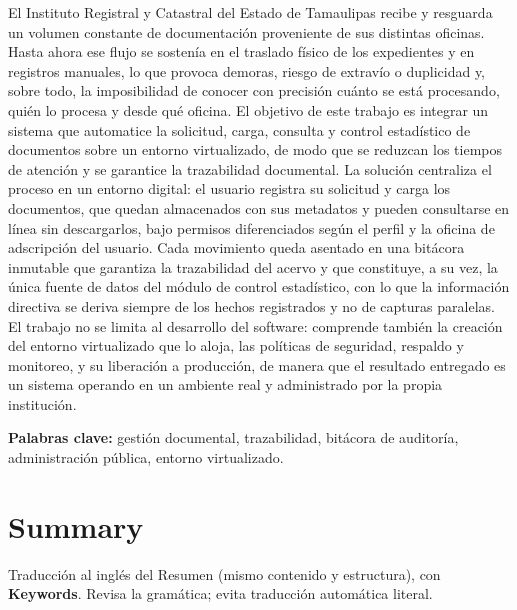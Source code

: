 El Instituto Registral y Catastral del Estado de Tamaulipas recibe y resguarda un volumen constante de documentación proveniente de sus distintas oficinas. Hasta ahora ese flujo se sostenía en el traslado físico de los expedientes y en registros manuales, lo que provoca demoras, riesgo de extravío o duplicidad y, sobre todo, la imposibilidad de conocer con precisión cuánto se está procesando, quién lo procesa y desde qué oficina. El objetivo de este trabajo es integrar un sistema que automatice la solicitud, carga, consulta y control estadístico de documentos sobre un entorno virtualizado, de modo que se reduzcan los tiempos de atención y se garantice la trazabilidad documental. La solución centraliza el proceso en un entorno digital: el usuario registra su solicitud y carga los documentos, que quedan almacenados con sus metadatos y pueden consultarse en línea sin descargarlos, bajo permisos diferenciados según el perfil y la oficina de adscripción del usuario. Cada movimiento queda asentado en una bitácora inmutable que garantiza la trazabilidad del acervo y que constituye, a su vez, la única fuente de datos del módulo de control estadístico, con lo que la información directiva se deriva siempre de los hechos registrados y no de capturas paralelas. El trabajo no se limita al desarrollo del software: comprende también la creación del entorno virtualizado que lo aloja, las políticas de seguridad, respaldo y monitoreo, y su liberación a producción, de manera que el resultado entregado es un sistema operando en un ambiente real y administrado por la propia institución.

\textbf{Palabras clave:} gestión documental, trazabilidad, bitácora de auditoría, administración pública, entorno virtualizado.

\clearpage
\section*{\centering Summary}

\begin{guia}
Traducción al inglés del Resumen (mismo contenido y estructura), con \textbf{Keywords}. Revisa la gramática; evita
traducción automática literal.
\end{guia}

